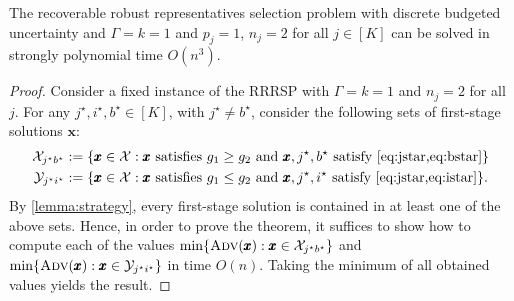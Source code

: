 \begin{theorem}\label{thm:easy_case_RRRS}
The recoverable robust representatives selection problem with discrete budgeted uncertainty and $\Gamma = k = 1$ and $p_j=1$, $n_j = 2$ for all $j\in[K]$ can be solved in strongly polynomial time $O(n^3)$.
\end{theorem}
\begin{proof}
Consider a fixed instance of the RRRSP with $\Gamma = k = 1$ and $n_j = 2$ for all $j$. For any $j^\star, i^\star, b^\star \in [K]$, with $j^\star \neq b^\star$, consider the following sets of first-stage solutions $\pmb x$: 
\begin{align*} \X_{j^\star b^\star} &:= \{ \pmb x\in \X : \pmb x \text{ satisfies } g_1 \geq g_2 \text{ and }\pmb x, j^\star, b^\star \text{ satisfy \cref{eq:jstar,eq:bstar}}\}\\
\mathcal{Y}_{j^\star i^\star} &:= \{ \pmb x\in \X : \pmb x \text{ satisfies } g_1 \leq g_2 \text{ and } \pmb x, j^\star, i^\star \text{ satisfy \cref{eq:jstar,eq:istar}}\}.
\end{align*}
By \cref{lemma:strategy}, every first-stage solution is contained in at least one of the above sets. Hence, in order to prove the theorem, it suffices to show how to compute each of the values
$\min\{\textsc{Adv}(\pmb x) : \pmb x  \in \mathcal{X}_{j^\star b^\star}\}$ and $\min\{\textsc{Adv}(\pmb x) : \pmb x  \in \mathcal{Y}_{j^\star i^\star}\}$ in time $O(n)$. Taking the minimum of all obtained values yields the result.


\end{proof}
